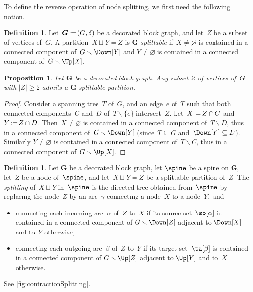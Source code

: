 \documentclass{amsart}
\newtheorem{proposition}[theorem]{Proposition}
\theoremstyle{definition}
\newtheorem{definition}[theorem]{Definition}
\renewcommand{\b}[1]{{\boldsymbol{#1}}} %
\newcommand{\ssm}{\smallsetminus} %
\newcommand{\eqdef}{\mbox{\,\raisebox{0.2ex}{\scriptsize\ensuremath{\mathrm:}}\ensuremath{=}\,}} %
\newcommand{\darkblue}{\color{darkblue}} %
\newcommand{\defn}[1]{\textsl{\darkblue #1}} %
\newcommand{\decoration}{\delta}
\begin{document}
To define the reverse operation of node splitting, we first need the following notion.

\begin{definition}
  \label{def:splittable}
  Let~$\b{G} \eqdef (G, \decoration)$ be a decorated block graph, and let~$Z$ be a subset of vertices of~$G$.
  A partition~$X \sqcup Y = Z$ is \defn{$\b{G}$-splittable} if~$X \ne \varnothing$ is contained in a connected component of~$G \ssm \Down[Y]$ and $Y \ne \varnothing$ is contained in a connected component of~$G \ssm \Up[X]$.
\end{definition}

\begin{proposition}
  \label{prop:splittablePartitions}
  Let $\b{G}$ be a decorated block graph. Any subset $Z$ of vertices of~$G$ with $|Z| \ge 2$ admits a $\b{G}$-splittable partition.
\end{proposition}

\begin{proof} 
  Consider a spanning tree~$T$ of~$G$, and an edge~$e$ of~$T$ such that both connected components~$C$ and~$D$ of~$T \ssm \{e\}$ intersect~$Z$.
  Let~$X \eqdef Z \cap C$ and~$Y \eqdef Z \cap D$.
  Then~$X \ne \varnothing$ is contained in a connected component of~$T \ssm D$, thus in a connected component of~$G \ssm \Down[Y]$ (since~$T \subseteq G$ and~$\Down[Y] \subseteq D$).
  Similarly $Y \ne \varnothing$ is contained in a connected component of~$T \ssm C$, thus in a connected component of~$G \ssm \Up[X]$.
\end{proof}

\begin{definition}
  \label{def:nodeSplitting} 
  Let $\b{G}$ be a decorated block graph, let $\spine$ be a spine on $\b{G}$, let~$Z$ be a node of~$\spine$, and let~$X \sqcup Y = Z$ be a splittable partition of~$Z$.
  The \defn{splitting} of~$X \sqcup Y$ in~$\spine$ is the directed tree obtained from~$\spine$ by replacing the node~$Z$ by an arc~$\gamma$ connecting a node~$X$ to a node~$Y$,~and
  \begin{itemize}
    \item connecting each incoming arc~$\alpha$ of~$Z$ to~$X$ if its source set~$\so[\alpha]$ is contained in a connected component of $G \ssm \Down[Z]$ adjacent to $\Down[X]$ and to~$Y$ otherwise, 
    \item connecting each outgoing arc~$\beta$ of~$Z$ to~$Y$ if its target set~$\ta[\beta]$ is contained in a connected component of $G \ssm \Up[Z]$ adjacent to $\Up[Y]$ and to~$X$ otherwise.
  \end{itemize}
  See \cref{fig:contractionSplitting}.
\end{definition}
\end{document}
